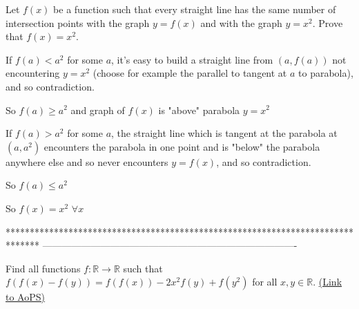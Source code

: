 \begin{solution}
	\begin{tcolorbox}Let $f(x)$ be a function such that every straight line has the same number of intersection points with the graph $y = f(x)$ and with the graph $y = x^2$. Prove that $f(x) = x^2.$\end{tcolorbox}
If $f(a)<a^2$ for some $a$, it's easy to build a straight line from $(a,f(a))$ not encountering $y=x^2$ (choose for example the parallel to tangent at $a$ to parabola), and so contradiction.

So $f(a)\ge a^2$ and graph of $f(x)$ is "above" parabola $y=x^2$

If $f(a)>a^2$ for some $a$, the straight line which is tangent at the parabola at $(a,a^2)$ encounters the parabola in one point and is "below" the parabola anywhere else and so never encounters $y=f(x)$, and so contradiction.

So $f(a)\le a^2$

So $f(x)=x^2$ $\forall x$
\end{solution}
*******************************************************************************
-------------------------------------------------------------------------------

\begin{problem}
	Find all functions $ f : \mathbb{R} \to\mathbb{R}$ such that $f(f(x)-f(y))=f(f(x))-2x^2f(y)+f(y^2)$ for all $x,y \in \mathbb{R}.$
	\flushright \href{https://artofproblemsolving.com/community/c6h391060}{(Link to AoPS)}
\end{problem}



